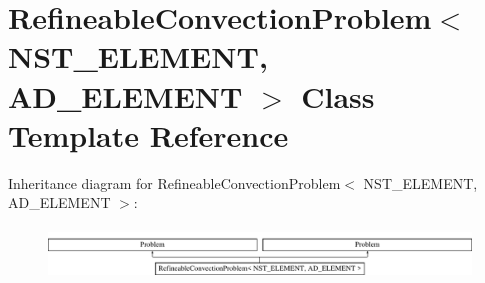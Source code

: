 \hypertarget{classRefineableConvectionProblem}{}\section{Refineable\+Convection\+Problem$<$ N\+S\+T\+\_\+\+E\+L\+E\+M\+E\+NT, A\+D\+\_\+\+E\+L\+E\+M\+E\+NT $>$ Class Template Reference}
\label{classRefineableConvectionProblem}
Inheritance diagram for Refineable\+Convection\+Problem$<$ N\+S\+T\+\_\+\+E\+L\+E\+M\+E\+NT, A\+D\+\_\+\+E\+L\+E\+M\+E\+NT $>$\+:\begin{figure}[H]
\begin{center}
\leavevmode
\includegraphics[height=1.417722cm]{classRefineableConvectionProblem}
\end{center}
\end{figure}
